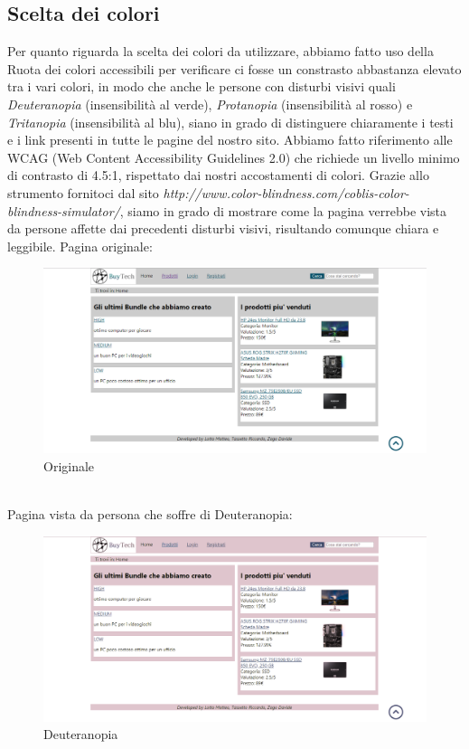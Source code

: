 \subsection{Scelta dei colori}
Per quanto riguarda la scelta dei colori da utilizzare, abbiamo fatto uso della Ruota dei colori accessibili per verificare ci fosse un constrasto abbastanza elevato tra i vari colori, in modo che anche le persone con disturbi visivi quali \emph{Deuteranopia} (insensibilità al verde), \emph{Protanopia} (insensibilità al rosso) e \emph{Tritanopia} (insensibilità al blu), siano in grado di distinguere chiaramente i testi e i link presenti in tutte le pagine del nostro sito.\newline
Abbiamo fatto riferimento alle WCAG (Web Content Accessibility Guidelines 2.0) che richiede un livello minimo di contrasto di 4.5:1, rispettato dai nostri accostamenti di colori.\newline
Grazie allo strumento fornitoci dal sito \emph{http://www.color-blindness.com/coblis-color-blindness-simulator/}, siamo in grado di mostrare come la pagina verrebbe vista da persone affette dai precedenti disturbi visivi, risultando comunque chiara e leggibile.\newline
Pagina originale:\newline
\begin{figure}[h]
	\label{originale}
	\centering %
	\includegraphics[width=1\textwidth]{immagini/screenhome.png}
	\caption{Originale} %
\end{figure}\mbox{} \\
Pagina vista da persona che soffre di Deuteranopia:\newline
\begin{figure}[h]
	\label{deuteranopia}
	\centering %
	\includegraphics[width=1\textwidth]{immagini/homedeute.png}
	\caption{Deuteranopia} %
\end{figure}\mbox{} \\
